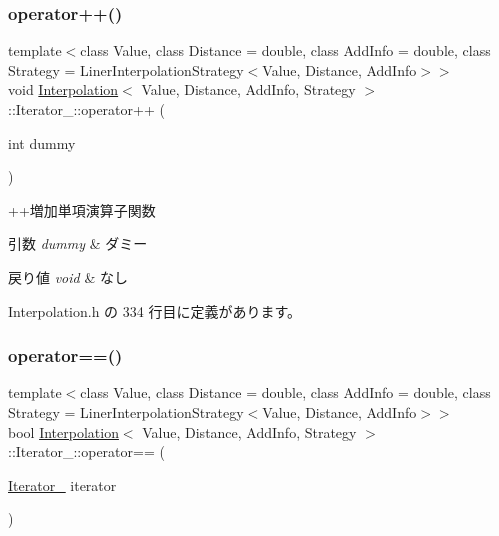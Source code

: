 \subsubsection{\texorpdfstring{operator++()}{operator++()}}
{\footnotesize\ttfamily template$<$class Value, class Distance = double, class Add\+Info = double, class Strategy = Liner\+Interpolation\+Strategy$<$\+Value, Distance, Add\+Info$>$$>$ \\
void \mbox{\hyperlink{class_interpolation}{Interpolation}}$<$ Value, Distance, Add\+Info, Strategy $>$\+::Iterator\+\_\+\+::operator++ (\begin{DoxyParamCaption}\item[{int}]{dummy }\end{DoxyParamCaption})\hspace{0.3cm}{\ttfamily [inline]}}



++増加単項演算子関数 


\begin{DoxyParams}{引数}
{\em dummy} & ダミー \\
\hline
\end{DoxyParams}

\begin{DoxyRetVals}{戻り値}
{\em void} & なし \\
\hline
\end{DoxyRetVals}


 Interpolation.\+h の 334 行目に定義があります。

\mbox{\label{class_interpolation_1_1_iterator___a922fd7a71f9c457df07b7d8070d01c08}} 
\subsubsection{\texorpdfstring{operator==()}{operator==()}}
{\footnotesize\ttfamily template$<$class Value, class Distance = double, class Add\+Info = double, class Strategy = Liner\+Interpolation\+Strategy$<$\+Value, Distance, Add\+Info$>$$>$ \\
bool \mbox{\hyperlink{class_interpolation}{Interpolation}}$<$ Value, Distance, Add\+Info, Strategy $>$\+::Iterator\+\_\+\+::operator== (\begin{DoxyParamCaption}\item[{\mbox{\hyperlink{class_interpolation_1_1_iterator__}{Iterator\+\_\+}}}]{iterator }\end{DoxyParamCaption})\hspace{0.3cm}{\ttfamily [inline]}}




